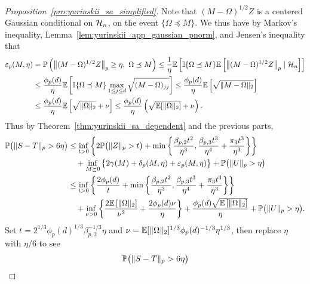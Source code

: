 \begin{proof}[Proposition~\ref{pro:yurinskii_sa_simplified}]
  Note that $(M -\Omega)^{1/2}Z$ is a centered Gaussian
  conditional on $\mathcal{H}_n$,
  on the event $\{\Omega \preceq M\}$.
  We thus have by Markov's inequality,
  Lemma~\ref{lem:yurinskii_app_gaussian_pnorm},
  and Jensen's inequality that
  \begin{align*}
    \varepsilon_p(M, \eta)
    &= \mathbb{P}\left(\big\| (M - \Omega)^{1/2} Z \big\|_p\geq \eta, \
    \Omega \preceq M\right)
    \leq
    \frac{1}{\eta}
    \mathbb{E}\left[
      \mathbb{I}\{\Omega \preceq M\}
      \mathbb{E}\left[
        \big\| (M - \Omega)^{1/2} Z \big\|_p
        \mid \mathcal{H}_n
      \right]
    \right] \\
    &\leq
    \frac{\phi_p(d)}{\eta}
    \mathbb{E}\left[
      \mathbb{I}\{\Omega \preceq M\}
      \max_{1 \leq j \leq d}
      \sqrt{(M - \Omega)_{j j}}
    \right]
    \leq
    \frac{\phi_p(d)}{\eta}
    \mathbb{E}\left[
      \sqrt{\|M - \Omega\|_2}
    \right] \\
    &\leq
    \frac{\phi_p(d)}{\eta}
    \mathbb{E}\left[
      \sqrt{\|\Omega\|_2} + \nu
    \right]
    \leq
    \frac{\phi_p(d)}{\eta}
    \left(\sqrt{\mathbb{E}[\|\Omega\|_2]} + \nu \right).
  \end{align*}
  Thus by Theorem~\ref{thm:yurinskii_sa_dependent} and the previous parts,
  \begin{align*}
    \mathbb{P}\big(\|S-T\|_p > 6\eta\big)
    &\leq
    \inf_{t>0}
    \left\{
      2 \mathbb{P}\big(\|Z\|_p>t\big)
      + \min\left\{
        \frac{\beta_{p,2} t^2}{\eta^3},
        \frac{\beta_{p,3} t^3}{\eta^4}
        + \frac{\pi_3 t^3}{\eta^3}
      \right\}
    \right\} \\
    &\quad+
    \inf_{M \succeq 0}
    \big\{ 2\gamma(M) + \delta_p(M,\eta)
    + \varepsilon_p(M, \eta)\big\}
    +\mathbb{P}\big(\|U\|_p>\eta\big) \\
    &\leq
    \inf_{t>0}
    \left\{
      \frac{2 \phi_p(d)}{t}
      + \min\left\{
        \frac{\beta_{p,2} t^2}{\eta^3},
        \frac{\beta_{p,3} t^3}{\eta^4}
        + \frac{\pi_3 t^3}{\eta^3}
      \right\}
    \right\} \\
    &\quad+
    \inf_{\nu > 0}
    \left\{ \frac{2\mathbb{E} \left[ \|\Omega\|_2 \right]}{\nu^2}
      + \frac{2 \phi_p(d) \nu}{\eta}
    \right\}
    + \frac{\phi_p(d) \sqrt{\mathbb{E} \left[ \|\Omega\|_2 \right]}}{\eta}
    +\mathbb{P}\big(\|U\|_p>\eta\big).
  \end{align*}
  Set $t = 2^{1/3} \phi_p(d)^{1/3} \beta_{p,2}^{-1/3} \eta$
  and $\nu = \mathbb{E}[\|\Omega\|_2]^{1/3} \phi_p(d)^{-1/3} \eta^{1/3}$,
  then replace $\eta$ with $\eta / 6$ to see
  \begin{align*}
    \P\big(\|S-T\|_p > 6\eta\big)

\end{align*}
\end{proof}
